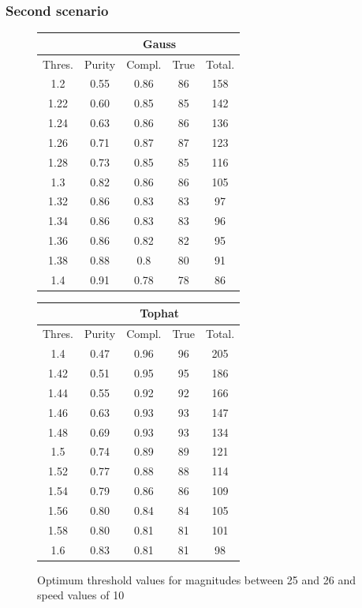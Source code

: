 \documentclass{article}
\begin{document}
\subsubsection{Second scenario}
\begin{figure}[H]
\centering
\begin{tabular}{|c|c|c|c|c|}
\hline
\multicolumn{1}{|c|}{} & \multicolumn{4}{c|}{Gauss} \\
\hline \hline
Thres. & Purity & Compl. & True & Total.\\
\hline
1.2 & 0.55 & 0.86 & 86 & 158\\
\hline
1.22 & 0.60 & 0.85 & 85 & 142\\
\hline
1.24 & 0.63 & 0.86 & 86 & 136\\
\hline
1.26 & 0.71 & 0.87 & 87 & 123\\
\hline
1.28 & 0.73 & 0.85 & 85 & 116\\
\hline
1.3 & 0.82 & 0.86 & 86 & 105\\
\hline
1.32 & 0.86 & 0.83 & 83 & 97\\
\hline
1.34 & 0.86 & 0.83 & 83 & 96\\
\hline
1.36 & 0.86 & 0.82 & 82 & 95\\
\hline
1.38 & 0.88 & 0.8 & 80 & 91\\
\hline
1.4 & 0.91 & 0.78 & 78 & 86\\
\hline
\end{tabular}
\qquad
\begin{tabular}{|c|c|c|c|c|}
\hline
\multicolumn{1}{|c|}{} & \multicolumn{4}{c|}{Tophat} \\
\hline \hline
Thres. & Purity & Compl. & True & Total.\\
\hline
1.4 & 0.47 & 0.96 & 96 & 205\\
\hline
1.42 & 0.51 & 0.95 & 95 & 186\\
\hline
1.44 & 0.55 & 0.92 & 92 & 166\\
\hline
1.46 & 0.63 & 0.93 & 93 & 147\\
\hline
1.48 & 0.69 & 0.93 & 93 & 134\\
\hline
1.5 & 0.74 & 0.89 & 89 & 121\\
\hline
1.52 & 0.77 & 0.88 & 88 & 114\\
\hline
1.54 & 0.79 & 0.86 & 86 & 109\\
\hline
1.56 & 0.80 & 0.84 & 84 & 105\\
\hline
1.58 & 0.80 & 0.81 & 81 & 101\\
\hline
1.6 & 0.83 & 0.81 & 81 & 98\\
\hline
\end{tabular}
\captionsetup{labelformat=andtable}
\caption{Optimum threshold values for magnitudes between 25 and 26 and speed values of 10}
\end{figure}
\end{document}
